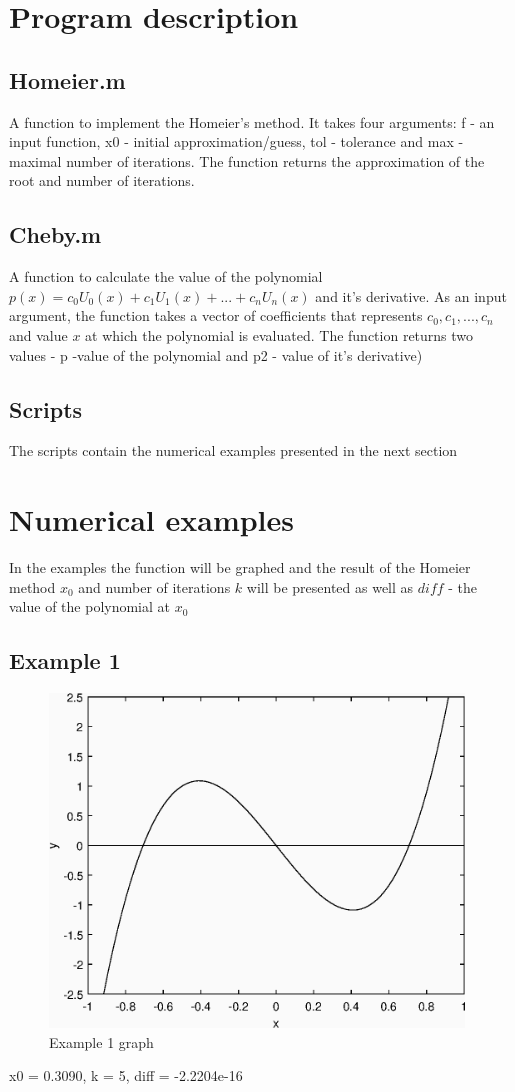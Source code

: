 \documentclass[12pt]{article}
\begin{document}
\section{Program description}
\subsection{Homeier.m}
A function to implement the Homeier's method. It takes four arguments: f - an input function, x0 - initial approximation/guess, tol - tolerance and max - maximal number of iterations. The function returns the approximation of the root and number of iterations.
\subsection{Cheby.m}
A function to calculate the value of the polynomial$p(x)=c_0U_0(x)+c_1U_1(x)+...+c_nU_n(x)$ and it's derivative. As an input argument, the function takes a vector of coefficients that represents $c_0, c_1, ..., c_n$ and value $x$ at which the polynomial is evaluated. The function returns two values - p -value of the polynomial and p2 - value of it's derivative)
\subsection{Scripts}
The scripts contain the numerical examples presented in the next section
\section{Numerical examples}
In the examples the function will be graphed and the result of the Homeier method $x_0$ and number of iterations $k$ will be presented as well as $diff$ - the value of the polynomial at $x_0$
\subsection{Example 1}
\begin{figure}[!htb]
\centering
\includegraphics[width=110mm]{ex1}
\caption{Example 1 graph}
\end{figure}
x0 = 0.3090,
k = 5,
diff = -2.2204e-16

\end{document}
